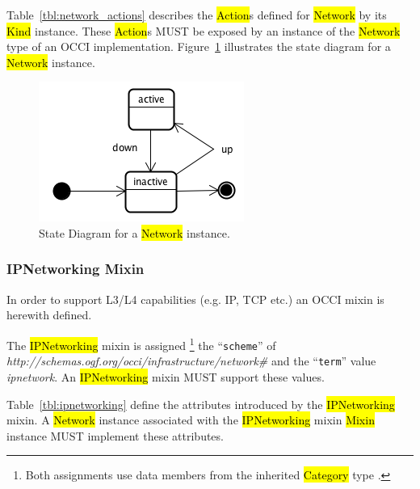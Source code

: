 \documentclass[10pt,a4paper]{article}
\begin{document}
Table~\ref{tbl:network_actions} describes the \hl{Action}s defined for
\hl{Network} by its \hl{Kind} instance. These \hl{Action}s MUST be exposed 
by an instance of the \hl{Network} type of an OCCI implementation. 
Figure~\ref{fig:network_state} illustrates the state diagram for a \hl{Network} instance.

\begin{figure}[!h]
	\centering
	\includegraphics[scale=0.4]{figs/network-state.png}
	\caption{State Diagram for a \hl{Network} instance.}
	\label{fig:network_state}
\end{figure}

\subsubsection{IPNetworking Mixin}

In order to support L3/L4 capabilities (e.g. IP, TCP etc.) an OCCI mixin is herewith defined. 

The \hl{IPNetworking} mixin is assigned%
\footnote{Both assignments use data members from the inherited \hl{Category}
type \cite{occi:core}.}
the ``{\tt scheme}'' of
\textit{http://schemas.ogf.org/occi/infrastructure/network\#} and the ``{\tt term}'' value 
\textit{ipnetwork}. An \hl{IPNetworking} mixin MUST support these values.

Table~\ref{tbl:ipnetworking} define the attributes introduced by the
\hl{IPNetworking} mixin.  A \hl{Network} instance associated with the
\hl{IPNetworking} mixin \hl{Mixin} instance MUST implement these attributes.

\end{document}
